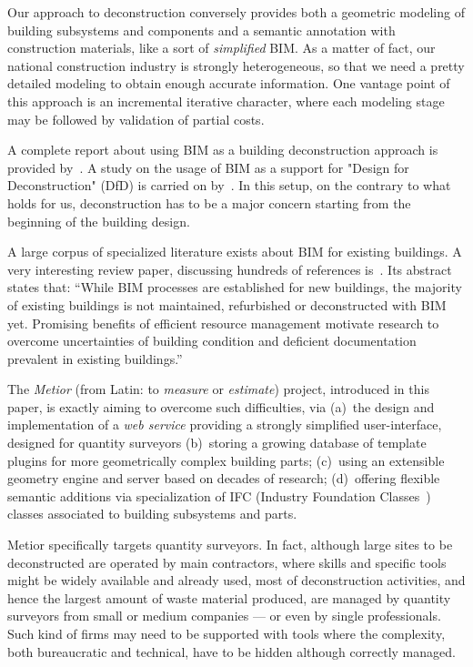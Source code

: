 \documentclass[a4paper,twoside]{article}
\begin{document}
Our approach to deconstruction conversely provides both a geometric modeling of building subsystems and components and a semantic annotation with construction materials, like a sort of \emph{simplified} BIM. As a matter of fact, our national construction industry is strongly heterogeneous, so that  we need a pretty detailed modeling to obtain enough accurate information.
One vantage point of this approach is an incremental iterative character, where each modeling stage may be followed by validation of partial costs.

A complete report about using BIM as a building deconstruction approach is provided by~\cite{galic2014bim}. A study on the usage of BIM as a support for "Design for Deconstruction" (DfD) is carried on by~\cite{akinade2015waste}. In this setup, on the contrary to what holds for us, deconstruction has to be a major concern starting from the beginning of the building design.

A large corpus of specialized literature exists about BIM for existing buildings. A very interesting review paper, discussing hundreds of references is~\cite{Volk2014109}. Its abstract states that:  ``While BIM processes are established for new buildings, the majority of existing buildings is not maintained, refurbished or deconstructed with BIM yet. Promising benefits of efficient resource management motivate research to overcome uncertainties of building condition and deficient documentation prevalent in existing buildings.'' 

The \emph{Metior} (from Latin: to  \emph{measure} or  \emph{estimate}) project, introduced in this paper, is exactly aiming to overcome such difficulties, via (a)~the design and implementation of a \emph{web service} providing a strongly simplified user-interface, designed for quantity surveyors (b)~storing a growing database of template plugins for more geometrically complex building parts; (c)~using an extensible geometry engine and server based on decades of research; (d)~offering flexible semantic additions via specialization of IFC (Industry Foundation Classes~\cite{ifc}) classes associated to building subsystems and parts.

Metior specifically targets quantity surveyors. In fact, although large sites to be deconstructed are operated by main contractors, where skills and specific tools might be widely available and already used, most of deconstruction activities, and hence the largest amount of waste material produced, are managed by quantity surveyors from small or medium companies --- or even by single professionals. Such kind of firms may need to be supported with tools where the complexity, both bureaucratic and technical, have to be hidden although correctly managed.
\end{document}
